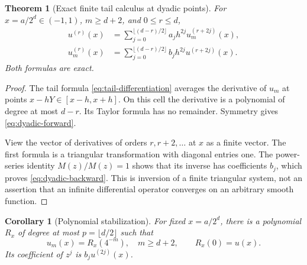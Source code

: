 \documentclass[11pt,a4paper]{article}
\numberwithin{equation}{section}
\newtheorem{theorem}{Theorem}[section]
\newtheorem{corollary}[corollary]{Corollary}
\theoremstyle{definition}
\begin{document}
\begin{theorem}[Exact finite tail calculus at dyadic points]\label{thm:dyadic}
For $x=a/2^d\in(-1,1)$, $m\geq d+2$, and $0\leq r\leq d$,
\begin{align}
 u^{(r)}(x)&=\sum_{j=0}^{\lfloor(d-r)/2\rfloor}
           a_jh^{2j}u_m^{(r+2j)}(x),\label{eq:dyadic-forward}\\
 u_m^{(r)}(x)&=\sum_{j=0}^{\lfloor(d-r)/2\rfloor}
           b_jh^{2j}u^{(r+2j)}(x).\label{eq:dyadic-backward}
\end{align}
Both formulas are exact.
\end{theorem}
\begin{proof}
The tail formula \eqref{eq:tail-differentiation} averages the derivative
of $u_m$ at points $x-hY\in[x-h,x+h]$. On this cell the derivative
is a polynomial of degree at most $d-r$. Its Taylor formula has no
remainder. Symmetry gives \eqref{eq:dyadic-forward}.

View the vector of derivatives of orders $r,r+2,\ldots$ at $x$ as a
finite vector. The first formula is a triangular transformation with
diagonal entries one. The power-series identity $M(z)/M(z)=1$
shows that its inverse has coefficients $b_j$, which proves
\eqref{eq:dyadic-backward}. This is inversion of a finite triangular
system, not an assertion that an infinite differential operator
converges on an arbitrary smooth function.
\end{proof}

\begin{corollary}[Polynomial stabilization]\label{cor:poly-stabilize}
For fixed $x=a/2^d$, there is a polynomial $R_x$ of degree at most
$p=\lfloor d/2\rfloor$ such that
\begin{equation}
 u_m(x)=R_x(4^{-m}),\quad m\geq d+2,
 \qquad R_x(0)=u(x).
 \label{eq:exact-poly}
\end{equation}
Its coefficient of $z^j$ is $b_ju^{(2j)}(x)$.
\end{corollary}
\end{document}
